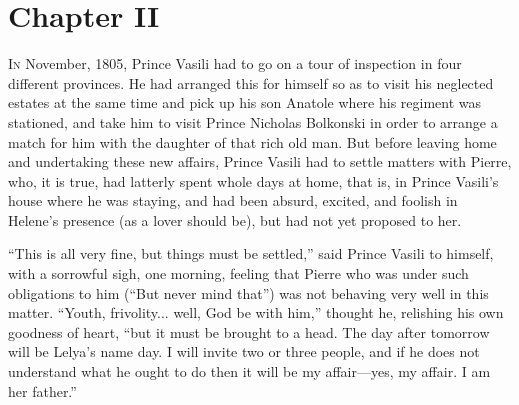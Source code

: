 \chapter*{Chapter II}
\ifaudio     
{} 
\fi

\lettrine[lines=2, loversize=0.3, lraise=0]{\initfamily I}{n}
November, 1805, Prince Vasili had to go on a tour of
inspection in four different provinces. He had arranged this for
himself so as to visit his neglected estates at the same time and
pick up his son Anatole where his regiment was stationed, and
take him to visit Prince Nicholas Bolkonski in order to arrange a
match for him with the daughter of that rich old man. But before
leaving home and undertaking these new affairs, Prince Vasili had
to settle matters with Pierre, who, it is true, had latterly
spent whole days at home, that is, in Prince Vasili's house where
he was staying, and had been absurd, excited, and foolish in
Helene's presence (as a lover should be), but had not yet
proposed to her.

``This is all very fine, but things must be settled,'' said
Prince Vasili to himself, with a sorrowful sigh, one morning,
feeling that Pierre who was under such obligations to him (``But
never mind that'') was not behaving very well in this
matter. ``Youth, frivolity... well, God be with him,'' thought
he, relishing his own goodness of heart, ``but it must be brought
to a head. The day after tomorrow will be Lelya's name day. I
will invite two or three people, and if he does not understand
what he ought to do then it will be my affair---yes, my affair. I
am her father.''

